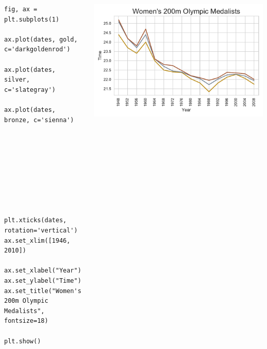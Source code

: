 \documentclass{beamer}
\begin{document}
\begin{frame}[fragile]
\tiny{
\begin{columns}
\begin{column}{0.45\textwidth}
\begin{verbatim}
fig, ax = plt.subplots(1)

ax.plot(dates, gold, c='darkgoldenrod')

ax.plot(dates, silver, c='slategray')

ax.plot(dates, bronze, c='sienna')









plt.xticks(dates, rotation='vertical')
ax.set_xlim([1946, 2010])

ax.set_xlabel("Year")
ax.set_ylabel("Time")
ax.set_title("Women's 200m Olympic Medalists", fontsize=18)

plt.show()
\end{verbatim}
\end{column}
\begin{column}{0.55\textwidth}
\includegraphics[width=\textwidth]{../olympics_4.pdf}
\end{column}
\end{columns}
}
\end{frame}
\end{document}
